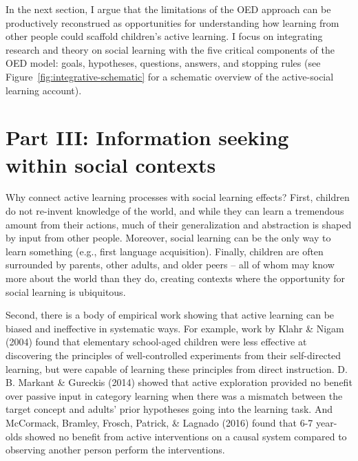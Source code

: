 \documentclass[oneside]{report}
\begin{document}
In the next section, I argue that the limitations of the OED approach
can be productively reconstrued as opportunities for understanding how
learning from other people could scaffold children's active learning. I
focus on integrating research and theory on social learning with the
five critical components of the OED model: goals, hypotheses, questions,
answers, and stopping rules (see Figure~\ref{fig:integrative-schematic}
for a schematic overview of the active-social learning account).

\hypertarget{active_social}{\section{Part III: Information seeking
within social contexts}\label{active_social}}

Why connect active learning processes with social learning effects?
First, children do not re-invent knowledge of the world, and while they
can learn a tremendous amount from their actions, much of their
generalization and abstraction is shaped by input from other people.
Moreover, social learning can be the only way to learn something (e.g.,
first language acquisition). Finally, children are often surrounded by
parents, other adults, and older peers -- all of whom may know more
about the world than they do, creating contexts where the opportunity
for social learning is ubiquitous.

Second, there is a body of empirical work showing that active learning
can be biased and ineffective in systematic ways. For example, work by
Klahr \& Nigam (2004) found that elementary school-aged children were
less effective at discovering the principles of well-controlled
experiments from their self-directed learning, but were capable of
learning these principles from direct instruction. D. B. Markant \&
Gureckis (2014) showed that active exploration provided no benefit over
passive input in category learning when there was a mismatch between the
target concept and adults' prior hypotheses going into the learning
task. And McCormack, Bramley, Frosch, Patrick, \& Lagnado (2016) found
that 6-7 year-olds showed no benefit from active interventions on a
causal system compared to observing another person perform the
interventions.
\end{document}
